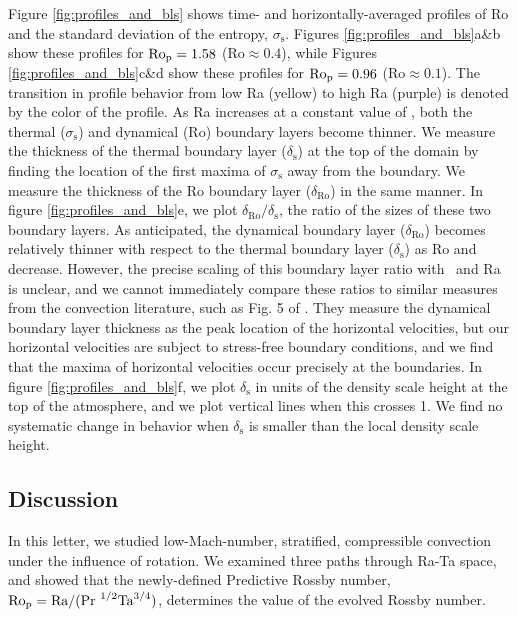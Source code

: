 Figure \ref{fig:profiles_and_bls} shows time- and horizontally-averaged profiles of
Ro and the standard deviation of the entropy, $\sigma_{\text{s}}$.
Figures \ref{fig:profiles_and_bls}a\&b show these profiles for $\text{Ro}_{\text{p}}=1.58$ ($\text{Ro} \approx 0.4$), while
Figures \ref{fig:profiles_and_bls}c\&d show these profiles for $\text{Ro}_{\text{p}}=0.96$ ($\text{Ro} \approx 0.1$). The transition
in profile behavior from low Ra (yellow) to high Ra (purple) is denoted by the color of the
profile.
As Ra increases at a constant value of
\pro, both the thermal ($\sigma_{\text{s}}$) and dynamical (Ro) boundary layers become thinner. 
We measure the
thickness of the thermal boundary layer ($\delta_{\text{s}}$) at the top of the domain by 
finding the location of the first maxima of $\sigma_{\text{s}}$ away from the boundary.
We measure
the thickness of the Ro boundary layer ($\delta_{\text{Ro}}$) 
in the same manner.
In figure \ref{fig:profiles_and_bls}e, we plot $\delta_{\text{Ro}}/\delta_{\text{s}}$, the ratio
of the sizes of these two boundary layers. As anticipated, the dynamical boundary layer ($\delta_{\text{Ro}}$)
becomes relatively thinner with respect to the thermal boundary layer ($\delta_{\text{s}}$)
as Ro and \pro$\,$ decrease. 
However, the precise scaling of this boundary layer ratio with \pro$\,$ and Ra is unclear, 
and we cannot immediately compare these ratios to similar measures from the \RB convection
literature, such as Fig. 5 of \cite{king&all2013}. They measure the dynamical boundary layer
thickness as the peak location of the horizontal velocities, but our horizontal velocities
are subject to stress-free boundary conditions, and we find that the maxima of horizontal 
velocities occur precisely at the boundaries.
In figure \ref{fig:profiles_and_bls}f, we plot $\delta_\text{s}$ in units of the density
scale height at the top of the atmosphere, and we plot vertical lines when this crosses 1.
We find no systematic change in behavior when $\delta_{\text{s}}$ is smaller than the
local density scale height.

\subsection{Discussion}
\label{sec_ro_p19_:discussion}
In this letter, we studied low-Mach-number, stratified, compressible convection 
under the influence of rotation.
We examined three paths through Ra-Ta space, and showed that the newly-defined 
Predictive Rossby number, $\text{Ro}_{\text{p}} = \text{Ra}/(\text{Pr }^{1/2}\text{Ta}^{3/4})$, determines the value of
the evolved Rossby number. 

